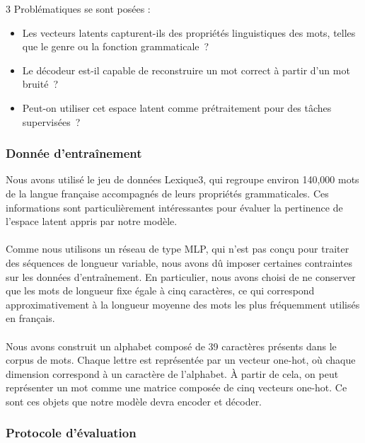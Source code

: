 \documentclass{article}
\begin{document}
3 Problématiques se sont posées :
\begin{itemize}
    \item Les vecteurs latents capturent-ils des propriétés linguistiques des mots, telles que le genre ou la fonction grammaticale~?
    \item Le décodeur est-il capable de reconstruire un mot correct à partir d’un mot bruité~?
    \item Peut-on utiliser cet espace latent comme prétraitement pour des tâches supervisées~?
\end{itemize}

\subsubsection{Donnée d'entraînement}

Nous avons utilisé le jeu de données Lexique3, qui regroupe environ 140,000 mots de la langue française accompagnés de leurs propriétés grammaticales. Ces informations sont particulièrement intéressantes pour évaluer la pertinence de l’espace latent appris par notre modèle.
\\ \\
Comme nous utilisons un réseau de type MLP, qui n’est pas conçu pour traiter des séquences de longueur variable, nous avons dû imposer certaines contraintes sur les données d’entraînement. En particulier, nous avons choisi de ne conserver que les mots de longueur fixe égale à cinq caractères, ce qui correspond approximativement à la longueur moyenne des mots les plus fréquemment utilisés en français.
\\ \\
Nous avons construit un alphabet composé de 39 caractères présents dans le corpus de mots. Chaque lettre est représentée par un vecteur one-hot, où chaque dimension correspond à un caractère de l’alphabet. À partir de cela, on peut représenter un mot comme une matrice composée de cinq vecteurs one-hot. Ce sont ces objets que notre modèle devra encoder et décoder.

\subsubsection{Protocole d'évaluation}
\end{document}
